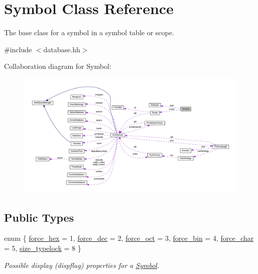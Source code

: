 \hypertarget{class_symbol}{}\section{Symbol Class Reference}
\label{class_symbol}


The base class for a symbol in a symbol table or scope.  




{\ttfamily \#include $<$database.\+hh$>$}



Collaboration diagram for Symbol\+:
\nopagebreak
\begin{figure}[H]
\begin{center}
\leavevmode
\includegraphics[width=350pt]{class_symbol__coll__graph}
\end{center}
\end{figure}
\subsection*{Public Types}
\begin{DoxyCompactItemize}
\item 
enum \{ \newline
\mbox{\hyperlink{class_symbol_ab1ec802c89320587a8c3a59bfa4fa803a3145c215e9f543a9c7841bb2dc343136}{force\+\_\+hex}} = 1, 
\mbox{\hyperlink{class_symbol_ab1ec802c89320587a8c3a59bfa4fa803a70ade8d38756a2876f47a21c889b6a8d}{force\+\_\+dec}} = 2, 
\mbox{\hyperlink{class_symbol_ab1ec802c89320587a8c3a59bfa4fa803a28a7364990a6437cacd7784803294adb}{force\+\_\+oct}} = 3, 
\mbox{\hyperlink{class_symbol_ab1ec802c89320587a8c3a59bfa4fa803a6423becb4a1dfab9a402260086c5673a}{force\+\_\+bin}} = 4, 
\newline
\mbox{\hyperlink{class_symbol_ab1ec802c89320587a8c3a59bfa4fa803ab0cb7096ee9806459711369aeddd68fb}{force\+\_\+char}} = 5, 
\mbox{\hyperlink{class_symbol_ab1ec802c89320587a8c3a59bfa4fa803a8009db83ae79a27a721a9b451b6ab102}{size\+\_\+typelock}} = 8
 \}
\begin{DoxyCompactList}\small\item\em Possible display (dispflag) properties for a \mbox{\hyperlink{class_symbol}{Symbol}}. \end{DoxyCompactList}\end{DoxyCompactItemize}
